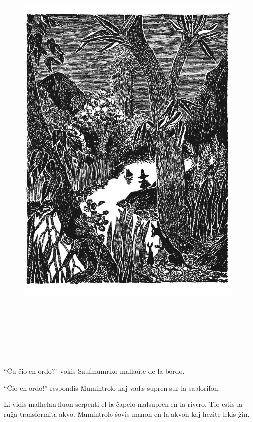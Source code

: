 \begin{figure}[htbp]
\centering
\includegraphics[width=450pt,height=631pt]{_11.jpg}
\caption{}
\label{_11}
\end{figure}

``Ĉu ĉio en ordo?'' vokis Snufmumriko mallaŭte de la bordo.

``Ĉio en ordo!'' respondis Mumintrolo kaj vadis supren sur la sablorifon.

Li vidis malhelan fluon serpenti el la ĉapelo malsupren en la rivero. Tio estis la ruĝa transformita akvo. Mumintrolo ŝovis manon en la akvon kaj hezite lekis ĝin.

